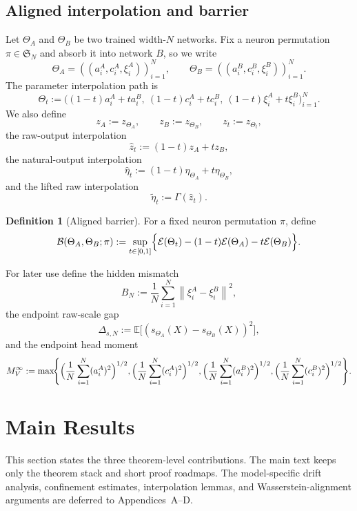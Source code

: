 \documentclass[11pt]{article}
\theoremstyle{definition}
\newtheorem{definition}[theorem]{Definition}
\newcommand{\E}{\mathbb{E}}
\newcommand{\norm}[1]{\left\lVert #1 \right\rVert}
\newcommand{\cE}{\mathcal{E}}
\newcommand{\cB}{\mathcal{B}}
\begin{document}
\subsection{Aligned interpolation and barrier}

Let $\Theta_A$ and $\Theta_B$ be two trained width-$N$ networks. Fix a neuron
permutation $\pi\in\mathfrak S_N$ and absorb it into network $B$, so we write
\[
  \Theta_A=((a_i^A,c_i^A,\xi_i^A))_{i=1}^N,
  \qquad
  \Theta_B=((a_i^B,c_i^B,\xi_i^B))_{i=1}^N.
\]
The parameter interpolation path is
\[
  \Theta_t
  :=
  \bigl((1-t)a_i^A+ta_i^B,\ (1-t)c_i^A+tc_i^B,\ (1-t)\xi_i^A+t\xi_i^B\bigr)_{i=1}^N.
\]
We also define
\[
  z_A:=z_{\Theta_A},
  \qquad
  z_B:=z_{\Theta_B},
  \qquad
  z_t:=z_{\Theta_t},
\]
the raw-output interpolation
\[
  \hat z_t:=(1-t)z_A+tz_B,
\]
the natural-output interpolation
\[
  \hat\eta_t:=(1-t)\eta_{\Theta_A}+t\eta_{\Theta_B},
\]
and the lifted raw interpolation
\[
  \tilde\eta_t:=\Gamma(\hat z_t).
\]

\begin{definition}[Aligned barrier]
For a fixed neuron permutation $\pi$, define
\[
  \cB(\Theta_A,\Theta_B;\pi)
  :=
  \sup_{t\in[0,1]}
  \Bigl\{
    \cE(\Theta_t)
    -
    (1-t)\cE(\Theta_A)
    -
    t\cE(\Theta_B)
  \Bigr\}.
\]
\end{definition}

For later use define the hidden mismatch
\begin{equation}
  B_N
  :=
  \frac1N\sum_{i=1}^N \norm{\xi_i^A-\xi_i^B}^2,
  \label{eq:hidden_mismatch_k1}
\end{equation}
the endpoint raw-scale gap
\begin{equation}
  \Delta_{s,N}
  :=
  \E\big[(s_{\Theta_A}(X)-s_{\Theta_B}(X))^2\big],
  \label{eq:raw_scale_gap}
\end{equation}
and the endpoint head moment
\begin{equation}
  M_V^\infty
  :=
  \max\!\Biggl\{
    \Bigl(\frac1N\sum_{i=1}^N (a_i^A)^2\Bigr)^{1/2},
    \Bigl(\frac1N\sum_{i=1}^N (c_i^A)^2\Bigr)^{1/2},
    \Bigl(\frac1N\sum_{i=1}^N (a_i^B)^2\Bigr)^{1/2},
    \Bigl(\frac1N\sum_{i=1}^N (c_i^B)^2\Bigr)^{1/2}
  \Biggr\}.
  \label{eq:head_moment_k1}
\end{equation}

\section{Main Results}

This section states the three theorem-level contributions. The main text keeps
only the theorem stack and short proof roadmaps. The model-specific drift
analysis, confinement estimates, interpolation lemmas, and Wasserstein-alignment
arguments are deferred to Appendices~A--D.
\end{document}
